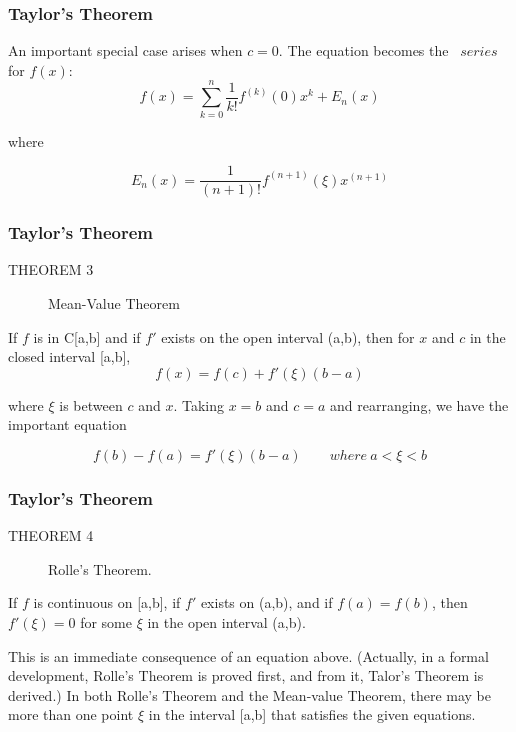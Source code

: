 \documentclass[notheorems,mathserif,table,compress]{beamer}  %
\begin{document}
\begin{frame}
\frametitle{Taylor's Theorem}
An important special case arises when $c=0$. The equation becomes the \mbox{ {$series$}} for $f(x)$:
\begin{displaymath}
f(x)=\sum_{k=0}^n\frac{1}{k!}f^{(k)}(0)x^k+E_n(x)
\end{displaymath}

where 

\begin{displaymath}
E_n(x)=\frac{1}{(n+1)!}f^{(n+1)}(\xi)x^{(n+1)}
\end{displaymath}

\end{frame}

\begin{frame}
\frametitle{Taylor's Theorem}
\begin{description}
\item[THEOREM 3] \textsf{Mean-Value Theorem}
\end{description}
If $f$ is in C[a,b] and if $f'$ exists on the open interval (a,b), then for $x$ and $c$ in the closed interval [a,b],
\begin{displaymath}
f(x)=f(c)+f'(\xi)(b-a)
\end{displaymath}

where $\xi$ is between $c$ and $x$.
Taking $x=b$ and $c=a$ and rearranging, we have the important equation

\begin{displaymath}
f(b)-f(a)=f'(\xi)(b-a) \qquad where\: a<\xi<b
\end{displaymath}
 
\end{frame}

\begin{frame}
\frametitle{Taylor's Theorem}
\begin{description}
\item[THEOREM 4] \textsf{Rolle's Theorem}.
\end{description}
If $f$ is continuous on [a,b], if $f'$ exists on (a,b), and if $f(a)=f(b)$, then $f'(\xi)=0$ for some $\xi$ in the open interval (a,b).
\newline

This is an immediate consequence of an equation above. (Actually, in a formal development, Rolle's Theorem is proved first, and from it, Talor's Theorem is derived.) In both Rolle's Theorem and the Mean-value Theorem, there may be more than one point $\xi$ in the interval [a,b] that satisfies the given equations.
\end{frame}
\end{document}

